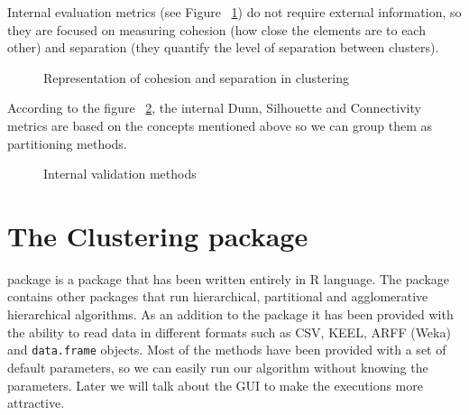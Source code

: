Internal evaluation metrics (see Figure ~\ref{fig:cohesion}) do not require external information, so they are focused on measuring cohesion (how close the elements are to each other) and separation (they quantify the level of separation between clusters).

\begin{figure}[htbp]
  \centering
    \caption{Representation of cohesion and separation in clustering \cite{b54}}%
    \label{fig:cohesion}%
\end{figure}

According to the figure ~\ref{fig:internal}, the internal Dunn, Silhouette and Connectivity metrics are based on the concepts mentioned above so we can group them as partitioning methods.

\begin{figure}[htbp]
  \centering
    \caption{Internal validation methods \cite{b54}}%
    \label{fig:internal}%
\end{figure}

\section{The Clustering package}\label{sec:clusteringpackage}

 package is a package that has been written entirely in R language. The package contains other  packages that run hierarchical, partitional and agglomerative hierarchical algorithms. As an addition to the package it has been provided with the ability to read data in different formats such as CSV, KEEL, ARFF (Weka) and \texttt{data.frame} objects. Most of the methods have been provided with a set of default parameters, so we can easily run our algorithm without knowing the parameters. Later we will talk about the GUI to make the executions more attractive.

